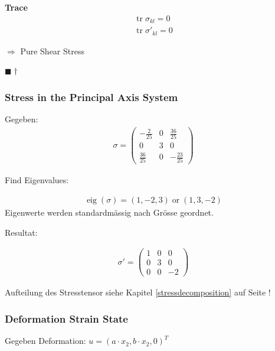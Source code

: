 \documentclass[a4paper]{scrartcl}
\newcommand{\qed}{\begin{flushright}
$\blacksquare \dagger$ \end{flushright}}
\begin{document}
\textbf{Trace}\\

\begin{align}
\operatorname{tr}\sigma_{kl}=0 \\
\operatorname{tr}\sigma'_{kl}=0 
\end{align}

$\Rightarrow$ Pure Shear Stress
\qed
\subsubsection{Stress in the Principal Axis System}
Gegeben:
\begin{align}
\sigma=\begin{pmatrix}
-\frac{2}{25} & 0 & \frac{36}{25} \\
0 & 3 & 0 \\
\frac{36}{25}& 0 & -\frac{23}{25}
\end{pmatrix}
\end{align}

Find Eigenvalues:

\begin{align}
\operatorname{eig}(\sigma)=\left(1,-2, 3\right) \operatorname{or}
\left(1,3,-2\right)
\end{align}
Eigenwerte werden standardmässig nach Grösse geordnet. 


Resultat:

\begin{align}
\sigma'=\begin{pmatrix}
1 & 0 & 0 \\
0 & 3 & 0 \\
0 & 0 & -2
\end{pmatrix}
\end{align}

Aufteilung des Stresstensor siehe Kapitel \ref{stressdecomposition} auf Seite
\pageref{stressdecomposition}!

\subsubsection{Deformation Strain State}\label{9.3} %
Gegeben Deformation: $u = (a \cdot x_2, b \cdot x_2, 0)^T$
\end{document}
